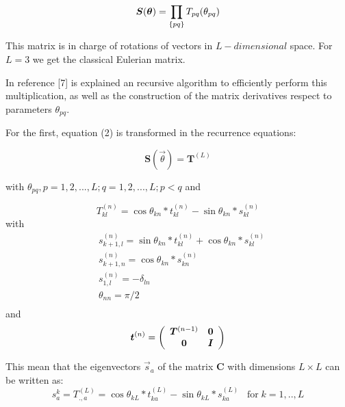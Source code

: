 \documentclass[preprint,amsmath,amssymb,superscriptaddress,showpacs,pre]{revtex4-1}
\let\originalleft\left
\let\originalright\right
\renewcommand{\left}{\mathopen{}\mathclose\bgroup\originalleft}
\renewcommand{\right}{\aftergroup\egroup\originalright}
\begin{document}
\begin{equation}
\bm S (\bm \theta)=\prod_{\left\lbrace pq\right\rbrace }T_{pq}(\theta_{pq})
\end{equation}
 
 This matrix is in charge of rotations of vectors in $L-dimensional$ space. For $L=3$ we get the classical Eulerian matrix. 

 In reference [7] is explained an recursive algorithm to efficiently perform this multiplication,  as well as the   construction of the matrix   derivatives respect to parameters $\theta_{pq}$. 

For the first, equation  (2) is transformed in  the recurrence equations:

\begin{equation}
\bm S(\vec{\theta} )=\bm T^{(L)}
\end{equation}

with $\theta_ {pq}, p =1,2, ..., L; q =1,2, ..., L; p <q$ and 


\begin{equation}
T^{(n)}_{kl}=\cos\theta_{kn} * t^{(n)}_{kl}-\sin\theta_{kn}* s^{(n)}_{kl}
\end{equation}
with
\begin{equation}
\begin{split}
&s^{(n)}_{k+1,l}=\sin\theta_{kn} * t^{(n)}_{kl}+\cos\theta_{kn}*s^{(n)}_{kl}\\
&s^{(n)}_{k+1,n}=\cos\theta_{kn}*s^{(n)}_{kn}\\
&s^{(n)}_{1,l}=-\delta_{ln}\\
&\theta_{nn}=\pi/2\\
&\end{split}
\end{equation}
and
\begin{equation} 
\bm t^{(n)} =  \left(
\begin{array}{cc}
\bm T^{(n-1)} & \bm 0  \\
\bm 0 &  \bm I\\

\end{array}
\right)
\end{equation}

This mean that the eigenvectors $\vec{s}_a$ of the matrix $\bm C$ with dimensions $L\times L$ can be written as:
\begin{equation}
s^{k}_a=T^{(L)}_{.,a}=\cos\theta_{kL} * t^{(L)}_{ka}-\sin\theta_{kL}* s^{(L)}_{ka} \;\;\; \text{for} \;k=1,..,L
\end{equation}
\end{document}
